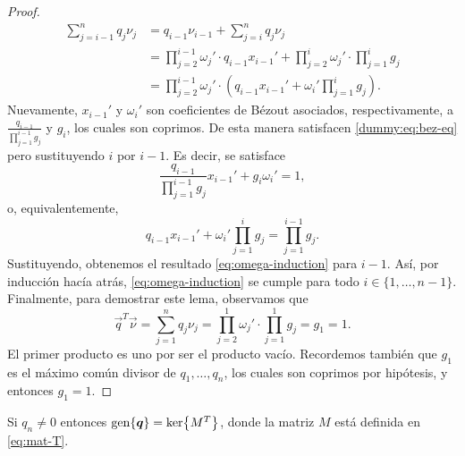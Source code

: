 \begin{proof}
\begin{align*}
		\sum_{j=i-1}^{n}q_j\nu_j
		&= q_{i-1}\nu_{i-1} + \sum_{j=i}^{n}q_j\nu_j \\
		&= \prod_{j=2}^{i-1}\omega_j' \cdot q_{i-1}x_{i-1}' + \prod_{j=2}^{i}\omega_j' \cdot
		\prod_{j=1}^{i}g_j \\
		&= \prod_{j=2}^{i-1}\omega_j' \cdot \left( q_{i-1}x_{i-1}' + \omega_i'
			\prod_{j=1}^{i}g_j \right).
	\end{align*}
	Nuevamente, $x_{i-1}'$ y $\omega_i'$ son coeficientes de Bézout asociados, respectivamente, a
	$\frac{q_{i-1}}{\prod_{j=1}^{i-1}g_j}$ y $g_i$, los cuales son coprimos. De esta manera
	satisfacen \eqref{dummy:eq:bez-eq} pero sustituyendo $i$ por $i - 1$. Es decir, se satisface
	\begin{equation*}
		\frac{q_{i-1}}{\prod_{j=1}^{i-1}g_j}x_{i-1}' +
		g_i \omega_i' = 1,
	\end{equation*}
	o, equivalentemente,
	\begin{equation*}
		q_{i-1}x_{i-1}' + \omega_i'\prod_{j=1}^{i}g_j = \prod_{j=1}^{i-1}g_j.
	\end{equation*}
	Sustituyendo, obtenemos el resultado \eqref{eq:omega-induction} para $i - 1$. Así, por inducción
	hacía atrás, \eqref{eq:omega-induction} se cumple para todo $i \in \lbrace 1, \ldots, n - 1
	\rbrace$. Finalmente, para demostrar este lema, observamos que
	\begin{equation*}
		\vec{q}^T\vec{\nu} = \sum_{j=1}^{n}q_j\nu_j = \prod_{j=2}^{1}\omega_j'
		\cdot \prod_{j=1}^{1}g_j = g_1 = 1.
	\end{equation*}
	El primer producto es uno por ser el producto vacío. Recordemos también que $g_1$ es el máximo
	común divisor de $q_1, \ldots, q_n$, los cuales son coprimos por hipótesis, y entonces $g_1 = 1$.
\end{proof}
\begin{lemma}
	\label{lemma:iso2}
	Si $q_n \neq 0$ entonces $\operatorname{gen}\lbrace \boldsymbol{q} \rbrace = \mathop{\mathrm{ker}{\left\lbrace M^T \right\rbrace}}$, donde la matriz $M$ está
	definida en \eqref{eq:mat-T}.
\end{lemma}
